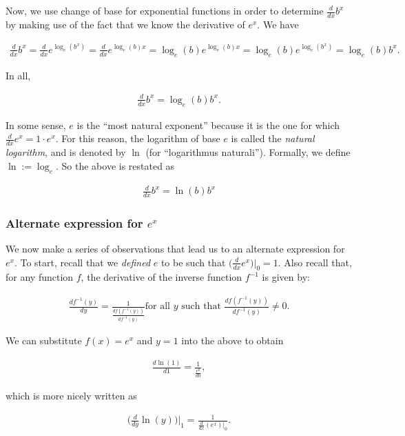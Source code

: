 Now, we use change of base for exponential functions in order to determine $\frac{d}{dx} b^x$ by making use of the fact that we know the derivative of $e^x$. We have

\begin{align*}
    \frac{d}{dx} b^x = \frac{d}{dx} e^{\log_e(b^x)} = \frac{d}{dx} e^{\log_e(b) x} = \log_e(b) e^{\log_e(b) x} = \log_e(b) e^{\log_e(b^x)} = \log_e(b) b^x.
\end{align*}

In all,

\begin{align*}
    \frac{d}{dx} b^x = \log_e(b) b^x.
\end{align*}

In some sense, $e$ is the ``most natural exponent'' because it is the one for which $\frac{d}{dx} e^x = 1 \cdot e^x$. For this reason, the logarithm of base $e$ is called the \textit{natural logarithm}, and is denoted by $\ln$ (for ``logarithmus naturali''). Formally, we define $\ln := \log_e$. So the above is restated as

\begin{align*}
    \boxed
    {
        \frac{d}{dx} b^x = \ln(b) b^x
    }
\end{align*}

\subsubsection*{Alternate expression for $e^x$}

We now make a series of observations that lead us to an alternate expression for $e^x$. To start, recall that we \textit{defined} $e$ to be such that $\Big( \frac{d}{dx} e^x \Big)\Big|_0 = 1$. Also recall that, for any function $f$, the derivative of the inverse function $f^{-1}$ is given by:

\begin{align*}
    \frac{df^{-1}(y)}{dy} = \frac{1}{\frac{df(f^{-1}(y))}{df^{-1}(y)}} \text{for all $y$ such that $\frac{df(f^{-1}(y))}{df^{-1}(y)} \neq 0$}.
\end{align*}

We can substitute $f(x) = e^x$ and $y = 1$ into the above to obtain

\begin{align*}
    \frac{d\ln(1)}{d1} = \frac{1}{\frac{e^0}{d0}},
\end{align*}

which is more nicely written as

\begin{align*}
    \Big( \frac{d}{dy} \ln(y) \Big)\Big|_1 = \frac{1}{\frac{d}{dx}(e^x)|_0}.
\end{align*}

